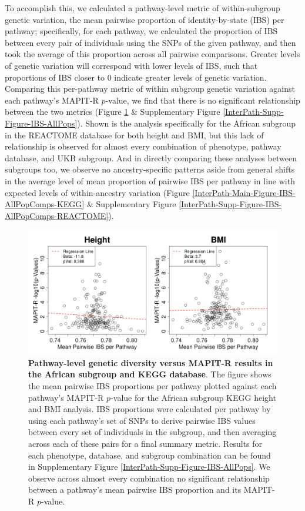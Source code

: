 \documentclass[12pt,a4paper]{article}
\begin{document}
To accomplish this, we calculated a pathway-level metric of within-subgroup genetic variation, the mean pairwise proportion of identity-by-state (IBS) per pathway; specifically, for each pathway, we calculated the proportion of IBS between every pair of individuals using the SNPs of the given pathway, and then took the average of this proportion across all pairwise comparisons. Greater levels of genetic variation will correspond with lower levels of IBS, such that proportions of IBS closer to 0 indicate greater levels of genetic variation. Comparing this per-pathway metric of within subgroup genetic variation against each pathway's MAPIT-R $p$-value, we find that there is no significant relationship between the two metrics (Figure \ref{InterPath-Main-Figure-IBS-African} \& Supplementary Figure \ref{InterPath-Supp-Figure-IBS-AllPops}). Shown is the analysis specifically for the African subgroup in the REACTOME database for both height and BMI, but this lack of relationship is observed for almost every combination of phenotype, pathway database, and UKB subgroup. And in directly comparing these analyses between subgroups too, we observe no ancestry-specific patterns aside from general shifts in the average level of mean proportion of pairwise IBS per pathway in line with expected levels of within-ancestry variation (Figure \ref{InterPath-Main-Figure-IBS-AllPopComps-KEGG} \& Supplementary Figure \ref{InterPath-Supp-Figure-IBS-AllPopComps-REACTOME}). 

\begin{figure}[htb]
\centering
\includegraphics[scale=.35]{Images/Main/InterPath_Main_Figure_IBS_vs3_African.png}
\caption[TBD]{\textbf{Pathway-level genetic diversity versus MAPIT-R results in the African subgroup and KEGG database}. The figure shows the mean pairwise IBS proportions per pathway plotted against each pathway's MAPIT-R $p$-value for the African subgroup KEGG height and BMI analysis. IBS proportions were calculated per pathway by using each pathway's set of SNPs to derive pairwise IBS values between every set of individuals in the subgroup, and then averaging across each of these pairs for a final summary metric. Results for each phenotype, database, and subgroup combination can be found in Supplementary Figure \ref{InterPath-Supp-Figure-IBS-AllPops}. We observe across almost every combination no significant relationship between a pathway's mean pairwise IBS proportion and its MAPIT-R $p$-value.}
\label{InterPath-Main-Figure-IBS-African}
\end{figure}
\end{document}
